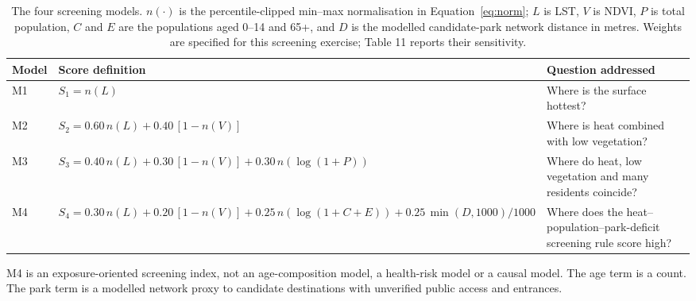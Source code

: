 \begin{table}[htbp]
\centering
\small
\caption{The four screening models. $n(\cdot)$ is the percentile-clipped
min--max normalisation in Equation~\ref{eq:norm}; $L$ is LST, $V$ is NDVI,
$P$ is total population, $C$ and $E$ are the populations aged 0--14 and 65+,
and $D$ is the modelled candidate-park network distance in metres. Weights are
specified for this screening exercise; Table 11 reports their sensitivity.}
\label{tab:models}
\begin{threeparttable}
\begin{tabularx}{\textwidth}{@{}l >{\raggedright\arraybackslash}X >{\raggedright\arraybackslash}p{3.7cm}@{}}
\toprule
Model & Score definition & Question addressed \\
\midrule
M1 & $S_1 = n(L)$ & Where is the surface hottest? \\
M2 & $S_2 = 0.60\,n(L) + 0.40\,[1-n(V)]$ & Where is heat combined with low vegetation? \\
M3 & $S_3 = 0.40\,n(L) + 0.30\,[1-n(V)] + 0.30\,n(\log(1+P))$ & Where do heat, low vegetation and many residents coincide? \\
M4 & $S_4 = 0.30\,n(L) + 0.20\,[1-n(V)] + 0.25\,n(\log(1+C+E)) + 0.25\,\min(D,1000)/1000$ & Where does the heat--population--park-deficit screening rule score high? \\
\bottomrule
\end{tabularx}
\begin{tablenotes}[flushleft]\footnotesize
\item M4 is an exposure-oriented screening index, not an age-composition model, a health-risk model or a causal model. The age term is a count. The park term is a modelled network proxy to candidate destinations with unverified public access and entrances.
\end{tablenotes}
\end{threeparttable}
\end{table}
